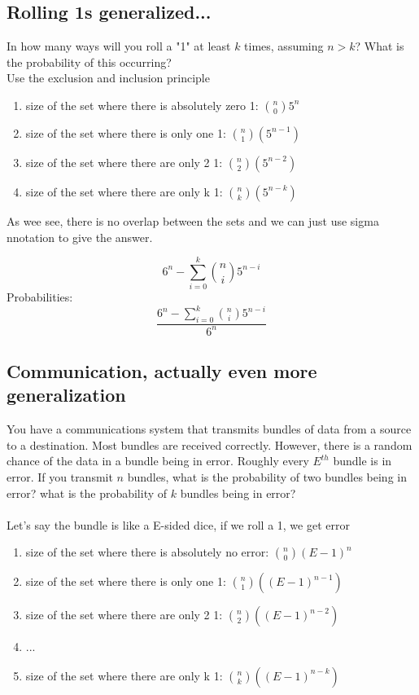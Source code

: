 \documentclass[a4paper,12pt]{article}
\begin{document}
\subsection{Rolling 1s generalized...}
In how many ways will you roll a "1" at least $k$ times, assuming $n > k$? 
What is the probability of this occurring?\\
Use the exclusion and inclusion principle
\begin{enumerate}
  \item{size of the set where there is absolutely zero 1: $\binom{n}{0}5^n$}
  \item{size of the set where there is only one 1: $\binom{n}{1}(5^{n-1})$}
  \item{size of the set where there are only 2 1: $\binom{n}{2}(5^{n-2})$} 
  \item{size of the set where there are only k 1: $\binom{n}{k}(5^{n-k})$} 
\end{enumerate}
As wee see, there is no overlap between the sets and we can just use sigma nnotation to give the answer.

\[ 6^n - \sum ^k _{i=0} \binom{n}{i}5^{n-i} \]
Probabilities: \\
\[\frac{ 6^n - \sum ^k _{i=0} \binom{n}{i}5^{n-i}} {6^n}\]
\subsection{Communication, actually even more generalization}
You have a communications system that transmits bundles of data
from a source to a destination.  Most bundles are received correctly.
However, there is a random chance of the data in a bundle being in
error.  Roughly every $E^{th}$ bundle is in error.  If you transmit
$n$ bundles, what is the probability of two bundles being
in error?  what is the probability of $k$ bundles being in
error?\\
\bigskip\\
Let's say the bundle is like a E-sided dice, if we roll a 1, we get error
\begin{enumerate}
  \item{size of the set where there is absolutely no error: $\binom{n}{0}(E-1)^n$}
  \item{size of the set where there is only one 1: $\binom{n}{1}((E-1)^{n-1})$}
  \item{size of the set where there are only 2 1: $\binom{n}{2}((E-1)^{n-2})$} 
  \item{...}
  \item{size of the set where there are only k 1: $\binom{n}{k}((E-1)^{n-k})$} 
\end{enumerate}
\end{document}
